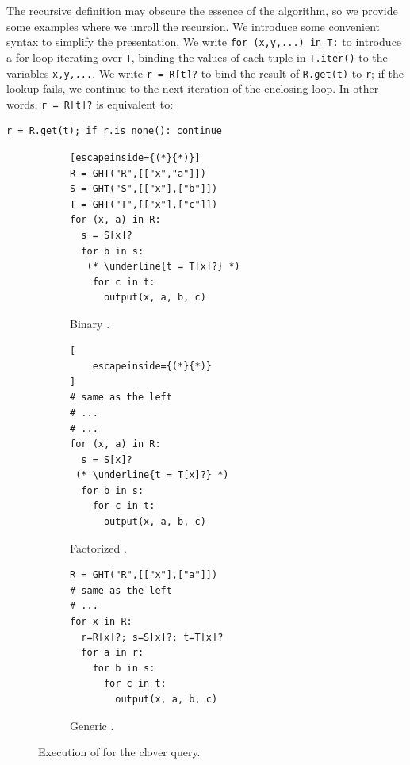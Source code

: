The recursive definition may obscure the essence of the \FJ algorithm,
  so we provide some examples where we unroll the recursion.
We introduce some convenient syntax to simplify the presentation.
We write \lstinline|for (x,y,...) in T:| 
  to introduce a for-loop iterating over \lstinline|T|, 
  binding the values of each tuple in \lstinline|T.iter()| 
  to the variables \lstinline|x,y,...|.
We write \lstinline|r = R[t]?| to bind the result of 
  \lstinline|R.get(t)| to \lstinline|r|;
  if the lookup fails, we continue to the next iteration of the 
  enclosing loop.
In other words, \texttt{r = R[t]?} is equivalent to:
%
\begin{lstlisting}
r = R.get(t); if r.is_none(): continue
\end{lstlisting}

\begin{figure}
  \begin{subfigure}[b]{0.3\linewidth}
\begin{lstlisting}[escapeinside={(*}{*)}]
R = GHT("R",[["x","a"]])
S = GHT("S",[["x"],["b"]])
T = GHT("T",[["x"],["c"]])
for (x, a) in R:
  s = S[x]?
  for b in s:
   (* \underline{t = T[x]?} *)
    for c in t:
      output(x, a, b, c)
\end{lstlisting}
    \caption{Binary \FJ.}
    \label{fig:bj-loop}
  \end{subfigure}
  \begin{subfigure}[b]{0.3\linewidth}
    \centering
\begin{lstlisting}[
    escapeinside={(*}{*)}
]
# same as the left
# ...
# ...
for (x, a) in R:
  s = S[x]?
 (* \underline{t = T[x]?} *)
  for b in s:
    for c in t:
      output(x, a, b, c)
\end{lstlisting}
    \caption{Factorized \FJ.}
    \label{fig:factorized-loop}
  \end{subfigure}
  \begin{subfigure}[b]{0.3\linewidth}
    \centering
\begin{lstlisting}
R = GHT("R",[["x"],["a"]])
# same as the left
# ...
for x in R:
  r=R[x]?; s=S[x]?; t=T[x]?
  for a in r:
    for b in s:
      for c in t:
        output(x, a, b, c)
\end{lstlisting}
    \caption{Generic \FJ.}
    \label{fig:gj-loop}
  \end{subfigure}
  \caption{Execution of \FJ for the clover query.}
\end{figure}

